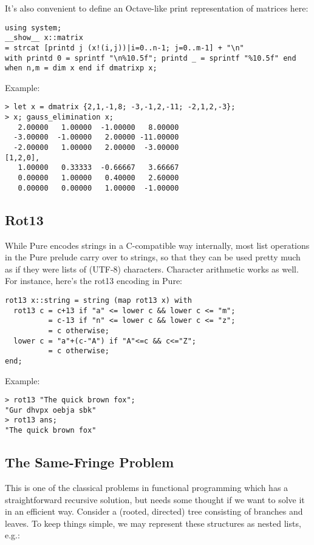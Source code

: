 \documentclass[a4paper,12pt]{article}
\begin{document}
\pagebreak[2]
\noindent It's also convenient to define an Octave-like print representation
of matrices here:

\begin{lstlisting}
using system;
__show__ x::matrix
= strcat [printd j (x!(i,j))|i=0..n-1; j=0..m-1] + "\n"
with printd 0 = sprintf "\n%10.5f"; printd _ = sprintf "%10.5f" end
when n,m = dim x end if dmatrixp x;
\end{lstlisting}

\noindent Example:

\begin{lstlisting}
> let x = dmatrix {2,1,-1,8; -3,-1,2,-11; -2,1,2,-3};
> x; gauss_elimination x;
   2.00000   1.00000  -1.00000   8.00000
  -3.00000  -1.00000   2.00000 -11.00000
  -2.00000   1.00000   2.00000  -3.00000
[1,2,0],
   1.00000   0.33333  -0.66667   3.66667
   0.00000   1.00000   0.40000   2.60000
   0.00000   0.00000   1.00000  -1.00000
\end{lstlisting}

\subsection{Rot13}

While Pure encodes strings in a C-compatible way internally, most list
operations in the Pure prelude carry over to strings, so that they can be used
pretty much as if they were lists of (UTF-8) characters. Character arithmetic
works as well. For instance, here's the rot13 encoding in Pure:

\begin{lstlisting}
rot13 x::string = string (map rot13 x) with
  rot13 c = c+13 if "a" <= lower c && lower c <= "m";
          = c-13 if "n" <= lower c && lower c <= "z";
          = c otherwise;
  lower c = "a"+(c-"A") if "A"<=c && c<="Z";
          = c otherwise;
end;
\end{lstlisting}

\noindent Example:

\begin{lstlisting}
> rot13 "The quick brown fox";
"Gur dhvpx oebja sbk"
> rot13 ans;
"The quick brown fox"
\end{lstlisting}

\subsection{The Same-Fringe Problem}

This is one of the classical problems in functional programming which has a
straightforward recursive solution, but needs some thought if we want to solve
it in an efficient way. Consider a (rooted, directed) tree consisting of
branches and leaves. To keep things simple, we may represent these structures
as nested lists, e.g.:
\end{document}

